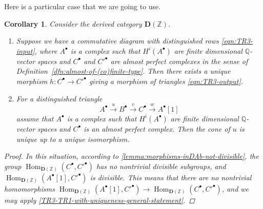 \documentclass[draft,leqno,12pt]{article}
\theoremstyle{plain}
\newtheorem{corollary}[theorem]{\indent\sc Corollary}
\theoremstyle{definition}
\DeclareMathOperator{\Hom}{Hom}
\newcommand{\ZZ}{\mathbb{Z}}
\newcommand{\QQ}{\mathbb{Q}}
\begin{document}
Here is a particular case that we are going to use.

\begin{corollary}
  \label{TR3-TR1-with-uniqueness}
  Consider the derived category $\mathbf{D} (\ZZ)$.

  \begin{enumerate}
  \item[$1)$] Suppose we have a commutative diagram with distinguished rows
    \eqref{eqn:TR3-input}, where $A^\bullet$ is a complex such that
    $H^i (A^\bullet)$ are finite dimensional $\QQ$-vector spaces and
    $C^\bullet$ and $C'^\bullet$ are almost perfect complexes in the sense of
    Definition~{\rm\ref{dfn:almost-of-(co)finite-type}}. Then there exists a unique
    morphism ${h\colon C^\bullet \to C'^\bullet}$ giving a morphism of triangles
    \eqref{eqn:TR3-output}.

  \item[$2)$] For a distinguished triangle
    $$A^\bullet \xrightarrow{u} B^\bullet \xrightarrow{v} C^\bullet \xrightarrow{w} A^\bullet[1]$$
    assume that $A^\bullet$ is a complex such that $H^i (A^\bullet)$ are finite
    dimensional $\QQ$-vector spaces and $C^\bullet$ is an almost perfect
    complex. Then the cone of $u$ is unique up to a unique isomorphism.
  \end{enumerate}

  \begin{proof}
    In this situation, according to \ref{lemma:morphisms-inDAb-not-divisible},
    the group $\Hom_{\mathbf{D} (\ZZ)} (C^\bullet, C'^\bullet)$ has no
    nontrivial divisible subgroups, and
    $\Hom_{\mathbf{D} (\ZZ)} (A^\bullet [1], C'^\bullet)$ is divisible. This
    means that there are no nontrivial homomorphisms
    $\Hom_{\mathbf{D} (\ZZ)} (A^\bullet [1], C'^\bullet) \to \Hom_{\mathbf{D} (\ZZ)} (C^\bullet, C'^\bullet)$,
    and we may apply \ref{TR3-TR1-with-uniqueness-general-statement}.
  \end{proof}
\end{corollary}
\end{document}

